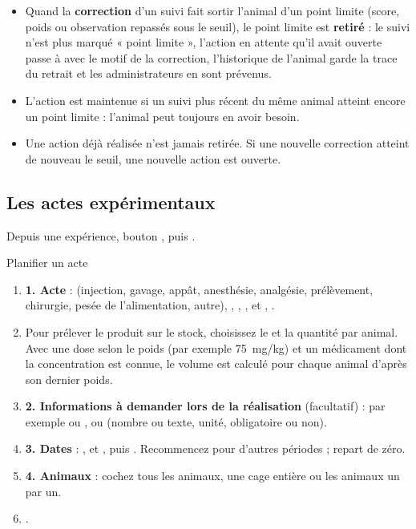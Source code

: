\documentclass[11pt,a4paper]{article}
\begin{document}
\begin{regle}
\begin{itemize}
  \item Quand la \textbf{correction} d'un suivi fait sortir l'animal d'un
    point limite (score, poids ou observation repassés sous le seuil), le
    point limite est \textbf{retiré} : le suivi n'est plus marqué « point
    limite », l'action en attente qu'il avait ouverte passe à
     avec le motif de la correction, l'historique de l'animal
    garde la trace du retrait et les administrateurs en sont prévenus.
  \item L'action est maintenue si un suivi plus récent du même animal
    atteint encore un point limite : l'animal peut toujours en avoir besoin.
  \item Une action déjà réalisée n'est jamais retirée. Si une nouvelle
    correction atteint de nouveau le seuil, une nouvelle action est ouverte.
\end{itemize}
\end{regle}

\subsection{Les actes expérimentaux}
Depuis une expérience, bouton , puis .

\begin{procedure}{Planifier un acte}
\begin{enumerate}
  \item \textbf{1. Acte} :  (injection, gavage, appât,
    anesthésie, analgésie, prélèvement, chirurgie, pesée de l'alimentation,
    autre), , ,
    ,  et ,
    .
  \item Pour prélever le produit sur le stock, choisissez le
     et la quantité par animal. Avec une dose selon
    le poids (par exemple 75~mg/kg) et un médicament dont la concentration
    est connue, le volume est calculé pour chaque animal d'après son dernier
    poids.
  \item \textbf{2. Informations à demander lors de la réalisation}
    (facultatif) : par exemple  ou
    , ou  (nombre ou
    texte, unité, obligatoire ou non).
  \item \textbf{3. Dates} : ,  et ,
    puis . Recommencez pour d'autres périodes ;
     repart de zéro.
  \item \textbf{4. Animaux} : cochez tous les animaux, une cage entière ou
    les animaux un par un.
  \item {}.
\end{enumerate}
\end{procedure}
\end{document}
